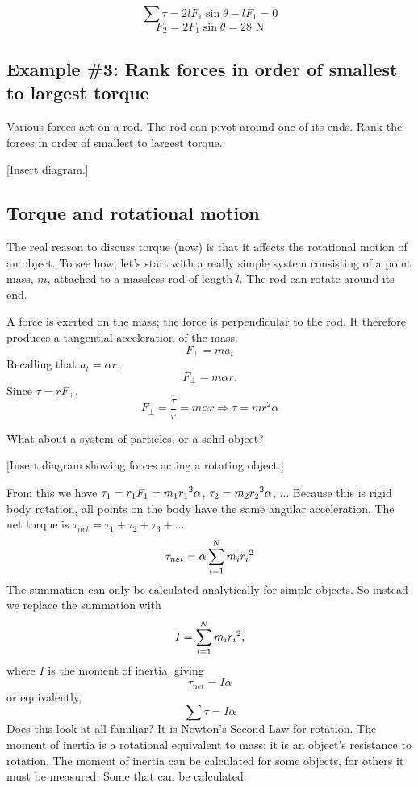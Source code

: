 $$\sum\tau=2lF_1\sin\theta-lF_1=0$$
$$F_2=2F_1\sin\theta=28\mbox{ N}$$

\subsection{Example \#3: Rank forces in order of smallest to largest torque}
Various forces act on a rod. The rod can pivot around one of its ends. Rank the forces in order of smallest to largest torque.

[Insert diagram.]

\vspace{5cm}

\subsection{Torque and rotational motion}
The real reason to discuss torque (now) is that it affects the rotational motion of an object. To see how, let's start with a really simple system consisting of a point mass, $m$, attached to a massless rod of length $l$. The rod can rotate around its end.
\vspace{5cm}

A force is exerted on the mass; the force is perpendicular to the rod. It therefore produces a tangential acceleration of the mass.
$$F_\perp=ma_t$$
Recalling that $a_t=\alpha r$,
$$F_\perp=m\alpha r.$$
Since $\tau=rF_\perp$,
$$F_\perp=\frac{\tau}{r}=m\alpha r\Rightarrow \boxed{\tau=mr^2\alpha}$$

What about a system of particles, or a solid object?

[Insert diagram showing forces acting a rotating object.]
\vspace{5cm}

From this we have $\tau_1=r_1F_1=m_1r_1\displaystyle^2\alpha$, $\tau_2=m_2r_2\displaystyle^2\alpha$, $...$ Because this is rigid body rotation, all points on the body have the same angular acceleration. The net torque is $\tau_{net}=\tau_1+\tau_2+\tau_3+...$
$$\tau_{net}=\alpha\sum_{i=1}^Nm_ir_i\displaystyle^2$$
The summation can only be calculated analytically for simple objects. So instead we replace the summation with
$$I=\sum_{i=1}^Nm_ir_i\displaystyle^2,$$
where $I$ is the moment of inertia, giving
$$\tau_{net}=I\alpha$$
or equivalently,
$$\boxed{\sum\tau=I\alpha}$$
Does this look at all familiar? It is Newton's Second Law for rotation. The moment of inertia is a rotational equivalent to mass; it is an object's resistance to rotation. The moment of inertia can be calculated for some objects, for others it must be measured. Some that can be calculated:

